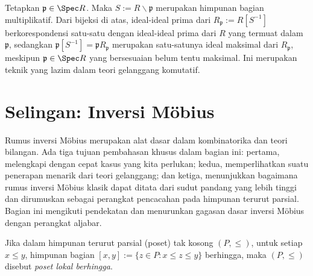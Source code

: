 \begin{example}\label{eg:localization-prime}
	Tetapkan $\mathfrak{p} \in \Spec R$. Maka $S := R \smallsetminus \mathfrak{p}$ merupakan himpunan bagian multiplikatif. Dari bijeksi di atas, ideal-ideal prima dari $R_\mathfrak{p} := R[S^{-1}]$ berkorespondensi satu-satu dengan ideal-ideal prima dari $R$ yang termuat dalam $\mathfrak{p}$, sedangkan $\mathfrak{p}[S^{-1}] = \mathfrak{p} R_\mathfrak{p}$ merupakan satu-satunya ideal maksimal dari $R_\mathfrak{p}$, meskipun $\mathfrak{p} \in \Spec R$ yang bersesuaian belum tentu maksimal. Ini merupakan teknik yang lazim dalam teori gelanggang komutatif.
\end{example}

\section{Selingan: Inversi Möbius}\label{sec:Mobius}
Rumus inversi Möbius merupakan alat dasar dalam kombinatorika dan teori bilangan. Ada tiga tujuan pembahasan khusus dalam bagian ini: pertama, melengkapi dengan cepat kasus yang kita perlukan; kedua, memperlihatkan suatu penerapan menarik dari teori gelanggang; dan ketiga, menunjukkan bagaimana rumus inversi Möbius klasik dapat ditata dari sudut pandang yang lebih tinggi dan dirumuskan sebagai perangkat pencacahan pada himpunan terurut parsial. Bagian ini mengikuti pendekatan \cite[\S\S 3.7--3.8]{Stan09} dan menurunkan gagasan dasar inversi Möbius dengan perangkat aljabar.

\begin{definition}
	Jika dalam himpunan terurut parsial (poset) tak kosong $(P, \leq)$, untuk setiap $x \leq y$, himpunan bagian $[x,y] := \{ z \in P: x \leq z \leq y \}$ berhingga, maka $(P,\leq)$ disebut \emph{poset lokal berhingga}.
\end{definition}

